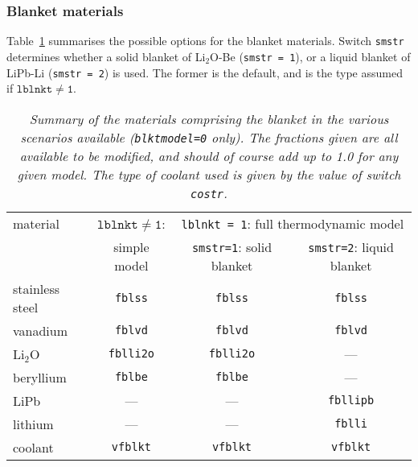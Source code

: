 \documentclass[11pt,a4paper]{report}
\begin{document}
\subsubsection{Blanket materials}
\label{sec:blanket_materials}

Table~\ref{tab:blanket} summarises the possible options for the blanket
materials. Switch \texttt{smstr} determines whether a solid blanket of
Li$_2$O-Be (\texttt{smstr = 1}), or a liquid blanket of LiPb-Li (\texttt{smstr
  = 2}) is used. The former is the default, and is the type assumed if
$\mathtt{lblnkt \not= 1}$.


\begin{table}[tbph]
\begin{center}

\begin{tabular}{||l||c||c||c||} \hline
material & $\mathtt{lblnkt \not= 1}$: & \multicolumn{2}{c||}{\texttt{lblnkt = 1}: full
thermodynamic model} \\ \cline{3-4}
 & simple model & \texttt{smstr=1}: solid blanket & \texttt{smstr=2}: liquid blanket
\\ \hline
stainless steel & \texttt{fblss}   & \texttt{fblss}   & \texttt{fblss}   \\
vanadium        & \texttt{fblvd}   & \texttt{fblvd}   & \texttt{fblvd}   \\
Li$_2$O         & \texttt{fblli2o} & \texttt{fblli2o} &     ---       \\
beryllium       & \texttt{fblbe}   & \texttt{fblbe}   &     ---       \\
LiPb            &     ---       &     ---       & \texttt{fbllipb} \\
lithium         &     ---       &     ---       & \texttt{fblli}   \\
coolant         & \texttt{vfblkt}  & \texttt{vfblkt}  & \texttt{vfblkt}  \\ \hline
\end{tabular}
\end{center}
\caption[Summary of blanket material scenarios]
{\label{tab:blanket}
  \textit{Summary of the materials comprising the blanket in the various scenarios
    available (\texttt{blktmodel=0} only). The fractions given are all
    available to be modified, and should of course add up to 1.0 for any given
    model. The type of coolant used is given by the value of switch \texttt{costr}.} 
}
\end{table}
\end{document}
